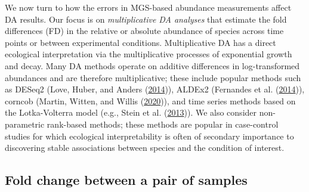 \documentclass[
]{article}
\begin{document}
We now turn to how the errors in MGS-based abundance measurements affect DA results.
Our focus is on \emph{multiplicative DA analyses} that estimate the fold differences (FD) in the relative or absolute abundance of species across time points or between experimental conditions.
Multiplicative DA has a direct ecological interpretation via the multiplicative processes of exponential growth and decay.
Many DA methods operate on additive differences in log-transformed abundances and are therefore multiplicative; these include popular methods such as DESeq2 (Love, Huber, and Anders (\protect\hyperlink{ref-love2014mode}{2014})), ALDEx2 (Fernandes et al. (\protect\hyperlink{ref-fernandes2014unif}{2014})), corncob (Martin, Witten, and Willis (\protect\hyperlink{ref-martin2020mode}{2020})), and time series methods based on the Lotka-Volterra model (e.g., Stein et al. (\protect\hyperlink{ref-stein2013ecol}{2013})).
We also consider non-parametric rank-based methods; these methods are popular in case-control studies for which ecological interpretability is often of secondary importance to discovering stable associations between species and the condition of interest.

\hypertarget{fold-change-between-a-pair-of-samples}{%
\subsection{Fold change between a pair of samples}\label{fold-change-between-a-pair-of-samples}}
\end{document}
